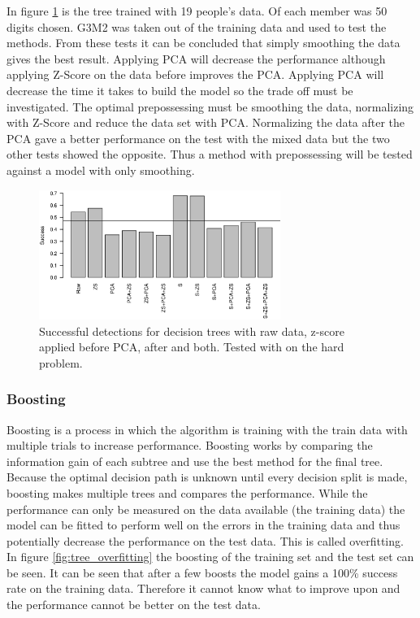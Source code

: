 In figure \ref{fig:tree_total_all} is the tree trained with 19 people's data. 
Of each member was 50 digits chosen.
G3M2 was taken out of the training data and used to test the methods.
From these tests it can be concluded that simply smoothing the data gives the best result.
Applying PCA will decrease the performance although applying Z-Score on the data before improves the PCA.
Applying PCA will decrease the time it takes to build the model so the trade off must be investigated.
The optimal prepossessing must be smoothing the data, normalizing with Z-Score and reduce the data set with PCA.
Normalizing the data after the PCA gave a better performance on the test with the mixed data but the two other tests showed the opposite.
Thus a method with prepossessing will be tested against a model with only smoothing.

\begin{figure}[H]
\centering
\includegraphics[width=0.7\textwidth]{graphics/tree_total_all}
\caption[Success for decision tree with different applied methods. Hard problem.]{
Successful detections for decision trees with raw data, z-score applied before PCA, after and both.
Tested with on the hard problem.}
\label{fig:tree_total_all}
\end{figure}

\subsubsection{Boosting}
Boosting is a process in which the algorithm is training with the train data with multiple trials to increase performance.
Boosting works by comparing the information gain of each subtree and use the best method for the final tree.
Because the optimal decision path is unknown until every decision split is made, boosting makes multiple trees and compares the performance.
While the performance can only be measured on the data available (the training data) the model can be fitted to perform well on the errors in the training data and thus potentially decrease the performance on the test data.
This is called overfitting. 
In figure \ref{fig:tree_overfitting} the boosting of the training set and the test set can be seen.
It can be seen that after a few boosts the model gains a 100\% success rate on the training data.
Therefore it cannot know what to improve upon and the performance cannot be better on the test data.

